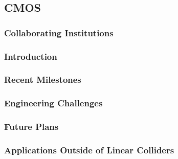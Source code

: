 \subsection{CMOS}
\subsubsection{Collaborating Institutions}
\subsubsection{Introduction}
\subsubsection{Recent Milestones}
\subsubsection{Engineering Challenges}
\subsubsection{Future Plans}
\subsubsection{Applications Outside of Linear Colliders}
